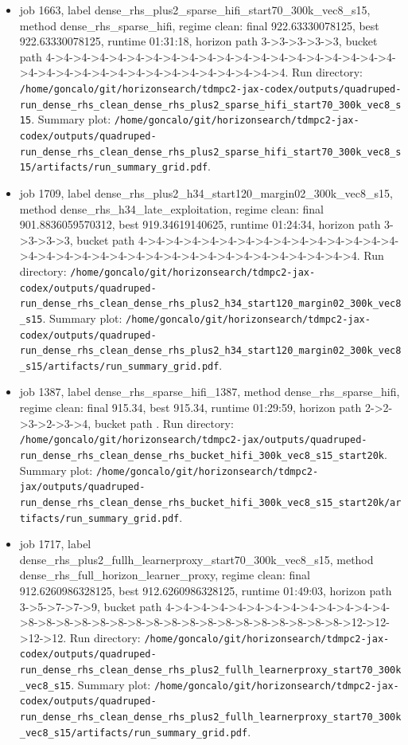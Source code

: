 \begin{itemize}
\item job 1663, label dense\_rhs\_plus2\_sparse\_hifi\_start70\_300k\_vec8\_s15, method dense\_rhs\_sparse\_hifi, regime clean: final 922.63330078125, best 922.63330078125, runtime 01:31:18, horizon path 3->3->3->3->3, bucket path 4->4->4->4->4->4->4->4->4->4->4->4->4->4->4->4->4->4->4->4->4->4->4->4->4->4->4->4->4->4->4->4->4->4->4. Run directory: \texttt{/home/goncalo/git/horizonsearch/tdmpc2-jax-codex/outputs/quadruped-run\_dense\_rhs\_clean\_dense\_rhs\_plus2\_sparse\_hifi\_start70\_300k\_vec8\_s15}. Summary plot: \texttt{/home/goncalo/git/horizonsearch/tdmpc2-jax-codex/outputs/quadruped-run\_dense\_rhs\_clean\_dense\_rhs\_plus2\_sparse\_hifi\_start70\_300k\_vec8\_s15/artifacts/run\_summary\_grid.pdf}.
\item job 1709, label dense\_rhs\_plus2\_h34\_start120\_margin02\_300k\_vec8\_s15, method dense\_rhs\_h34\_late\_exploitation, regime clean: final 901.8836059570312, best 919.34619140625, runtime 01:24:34, horizon path 3->3->3->3, bucket path 4->4->4->4->4->4->4->4->4->4->4->4->4->4->4->4->4->4->4->4->4->4->4->4->4->4->4->4->4->4->4->4->4->4. Run directory: \texttt{/home/goncalo/git/horizonsearch/tdmpc2-jax-codex/outputs/quadruped-run\_dense\_rhs\_clean\_dense\_rhs\_plus2\_h34\_start120\_margin02\_300k\_vec8\_s15}. Summary plot: \texttt{/home/goncalo/git/horizonsearch/tdmpc2-jax-codex/outputs/quadruped-run\_dense\_rhs\_clean\_dense\_rhs\_plus2\_h34\_start120\_margin02\_300k\_vec8\_s15/artifacts/run\_summary\_grid.pdf}.
\item job 1387, label dense\_rhs\_sparse\_hifi\_1387, method dense\_rhs\_sparse\_hifi, regime clean: final 915.34, best 915.34, runtime 01:29:59, horizon path 2->2->3->2->3->4, bucket path . Run directory: \texttt{/home/goncalo/git/horizonsearch/tdmpc2-jax/outputs/quadruped-run\_dense\_rhs\_clean\_dense\_rhs\_bucket\_hifi\_300k\_vec8\_s15\_start20k}. Summary plot: \texttt{/home/goncalo/git/horizonsearch/tdmpc2-jax/outputs/quadruped-run\_dense\_rhs\_clean\_dense\_rhs\_bucket\_hifi\_300k\_vec8\_s15\_start20k/artifacts/run\_summary\_grid.pdf}.
\item job 1717, label dense\_rhs\_plus2\_fullh\_learnerproxy\_start70\_300k\_vec8\_s15, method dense\_rhs\_full\_horizon\_learner\_proxy, regime clean: final 912.6260986328125, best 912.6260986328125, runtime 01:49:03, horizon path 3->5->7->7->9, bucket path 4->4->4->4->4->4->4->4->4->4->4->4->4->8->8->8->8->8->8->8->8->8->8->8->8->8->8->8->8->8->8->12->12->12->12. Run directory: \texttt{/home/goncalo/git/horizonsearch/tdmpc2-jax-codex/outputs/quadruped-run\_dense\_rhs\_clean\_dense\_rhs\_plus2\_fullh\_learnerproxy\_start70\_300k\_vec8\_s15}. Summary plot: \texttt{/home/goncalo/git/horizonsearch/tdmpc2-jax-codex/outputs/quadruped-run\_dense\_rhs\_clean\_dense\_rhs\_plus2\_fullh\_learnerproxy\_start70\_300k\_vec8\_s15/artifacts/run\_summary\_grid.pdf}.

\end{itemize}
